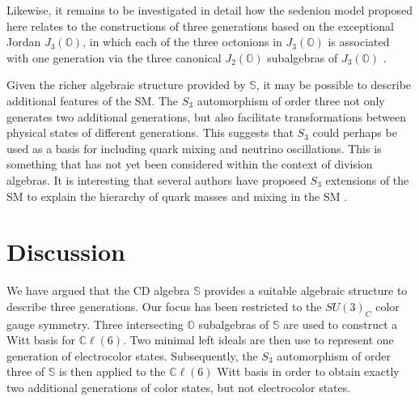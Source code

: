 \documentclass{article}
\newcommand{\bb}[1]{\mathbb{#1}}
\begin{document}
Likewise, it remains to be investigated in detail how the sedenion model proposed here relates to the constructions of three generations based on the exceptional Jordan $J_3(\bb{O})$, in which each of the three octonions in $J_3(\bb{O})$ is associated with one generation via the three canonical $J_2(\bb{O})$ subalgebras of $J_3(\bb{O})$ \cite{dubois2016exceptional,dubois2019exceptional,todorov2018octonions,todorov2018deducing,boyle2020standard,boyle2020standard2}.


Given the richer algebraic structure provided by $\bb{S}$, it may be possible to describe additional features of the SM. The $S_3$ automorphism of order three not only generates two additional generations, but also facilitate transformations between physical states of different generations. This suggests that $S_3$ could perhaps be used as a basis for including quark mixing and neutrino oscillations. This is something that has not yet been considered within the context of division algebras. It is interesting that several authors have proposed $S_3$ extensions of the SM to explain the hierarchy of quark masses and mixing in the SM \cite{kubo2003flavor,kubo2004higgs,kubo2004majorana,kubo2005minimal,mondragon2007lepton}.


\section{Discussion}
We have argued that the CD algebra $\bb{S}$ provides a suitable algebraic structure to describe three generations. Our focus has been restricted to the $SU(3)_C$ color gauge symmetry. Three intersecting $\bb{O}$ subalgebras of $\bb{S}$ are used to construct a Witt basis for $\bb{C}\ell(6)$. Two minimal left ideals are then use to represent one generation of electrocolor states. Subsequently, the $S_3$ automorphism of order three of $\bb{S}$ is then applied to the $\bb{C}\ell(6)$ Witt basis in order to obtain exactly two additional generations of color states, but not electrocolor states.  
\end{document}
